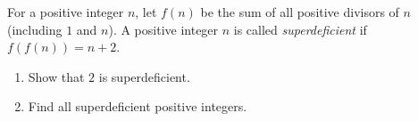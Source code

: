 For a positive integer $n$, let $f(n)$ be the sum of all positive divisors of $n$ (including $1$ and $n$). A positive integer $n$ is called \emph{superdeficient} if $f(f(n))=n+2$.
\begin{enumerate}
\item[(a)] Show that $2$ is superdeficient.
\item[(b)] Find all superdeficient positive integers.
\end{enumerate}
